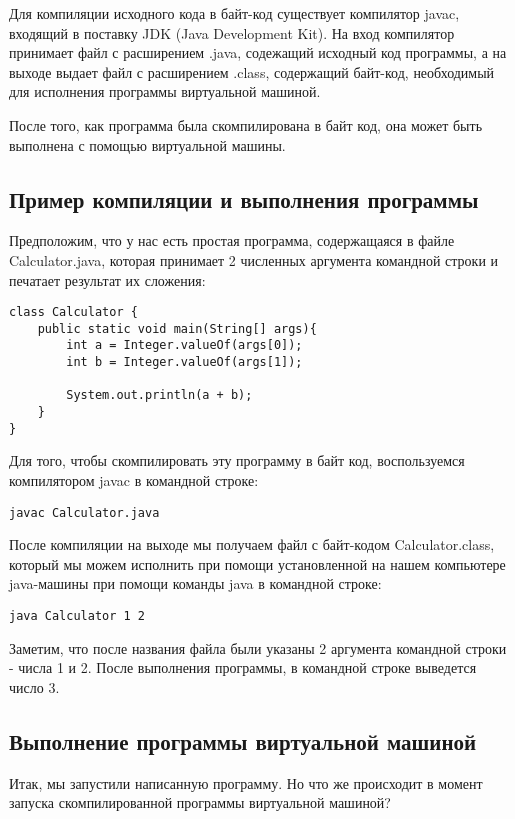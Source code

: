 \documentclass[]{scrartcl}
\begin{document}
Для компиляции исходного кода в байт-код существует компилятор javac, входящий в поставку JDK (Java Development Kit). На вход компилятор принимает файл с расширением .java, содежащий исходный код программы, а на выходе выдает файл с расширением .class, содержащий байт-код, необходимый для исполнения программы виртуальной машиной.

После того, как программа была скомпилирована в байт код, она может быть выполнена с помощью виртуальной машины.

\subsection{Пример компиляции и выполнения программы}

Предположим, что у нас есть простая программа, содержащаяся в файле Calculator.java, которая принимает 2 численных аргумента командной строки и печатает результат их сложения:

\begin{lstlisting}
class Calculator {
	public static void main(String[] args){
		int a = Integer.valueOf(args[0]);
		int b = Integer.valueOf(args[1]);

		System.out.println(a + b);
	}
}
\end{lstlisting}

Для того, чтобы скомпилировать эту программу в байт код, воспользуемся компилятором javac в командной строке:

\begin{lstlisting}
javac Calculator.java
\end{lstlisting}

После компиляции на выходе мы получаем файл с байт-кодом Calculator.class, который мы можем исполнить при помощи установленной на нашем компьютере java-машины при помощи команды java в командной строке:

\begin{lstlisting}
java Calculator 1 2
\end{lstlisting}

Заметим, что после названия файла были указаны 2 аргумента командной строки - числа 1 и 2. После выполнения программы, в командной строке выведется число 3.

\subsection{Выполнение программы виртуальной машиной}

Итак, мы запустили написанную программу. Но что же происходит в момент запуска скомпилированной программы виртуальной машиной?
\end{document}
